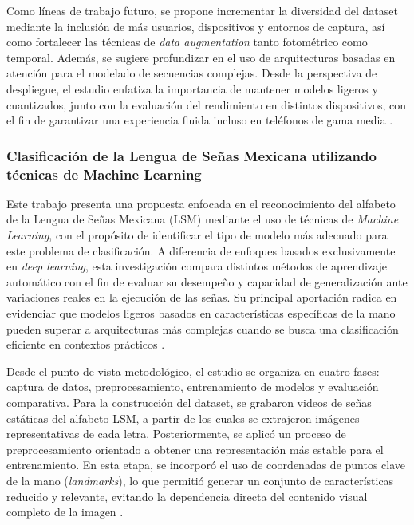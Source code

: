 	Como líneas de trabajo futuro, se propone incrementar la diversidad del dataset mediante la inclusión de más usuarios, dispositivos y entornos de captura, así como fortalecer las técnicas de \textit{data augmentation} tanto fotométrico como temporal. Además, se sugiere profundizar en el uso de arquitecturas basadas en atención para el modelado de secuencias complejas. Desde la perspectiva de despliegue, el estudio enfatiza la importancia de mantener modelos ligeros y cuantizados, junto con la evaluación del rendimiento en distintos dispositivos, con el fin de garantizar una experiencia fluida incluso en teléfonos de gama media \cite{salgado2024lsm_app_dl}.
	
	\subsubsection{Clasificación de la Lengua de Señas Mexicana utilizando técnicas de Machine Learning}
	
	Este trabajo presenta una propuesta enfocada en el reconocimiento del alfabeto de la Lengua de Señas Mexicana (LSM) mediante el uso de técnicas de \textit{Machine Learning}, con el propósito de identificar el tipo de modelo más adecuado para este problema de clasificación. A diferencia de enfoques basados exclusivamente en \textit{deep learning}, esta investigación compara distintos métodos de aprendizaje automático con el fin de evaluar su desempeño y capacidad de generalización ante variaciones reales en la ejecución de las señas. Su principal aportación radica en evidenciar que modelos ligeros basados en características específicas de la mano pueden superar a arquitecturas más complejas cuando se busca una clasificación eficiente en contextos prácticos \cite{salgado2024lsm_ml}.
	
	Desde el punto de vista metodológico, el estudio se organiza en cuatro fases: captura de datos, preprocesamiento, entrenamiento de modelos y evaluación comparativa. Para la construcción del dataset, se grabaron videos de señas estáticas del alfabeto LSM, a partir de los cuales se extrajeron imágenes representativas de cada letra. Posteriormente, se aplicó un proceso de preprocesamiento orientado a obtener una representación más estable para el entrenamiento. En esta etapa, se incorporó el uso de coordenadas de puntos clave de la mano (\textit{landmarks}), lo que permitió generar un conjunto de características reducido y relevante, evitando la dependencia directa del contenido visual completo de la imagen \cite{salgado2024lsm_ml}.
	
